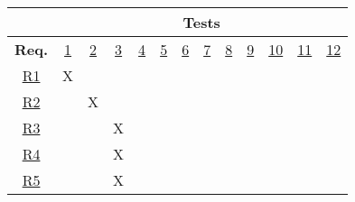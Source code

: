 \documentclass[12pt, titlepage]{article}
\begin{document}
\begin{table}[H]
    \centering
    
    \begin{tabular}{|c|cccccccccccc|}
\hline
 & \multicolumn{12}{c|}{\textbf{Tests}} \\
\hline
\textbf{Req.} & \multicolumn{1}{c|}{\hyperref[test-1]{1}} & \multicolumn{1}{c|}{\hyperref[test-2]{2}} & \multicolumn{1}{c|}{\hyperref[test-3]{3}}
& \multicolumn{1}{c|}{\hyperref[test-4]{4}} & \multicolumn{1}{c|}{\hyperref[test-5]{5}} & \multicolumn{1}{c|}{\hyperref[test-6]{6}}
& \multicolumn{1}{c|}{\hyperref[test-7]{7}} & \multicolumn{1}{c|}{\hyperref[test-8]{8}} & \multicolumn{1}{c|}{\hyperref[test-9]{9}}
& \multicolumn{1}{c|}{\hyperref[test-10]{10}} & \multicolumn{1}{c|}{\hyperref[test-11]{11}} & \hyperref[test-12]{12} \\ \hline

\hyperref[R1]{R1} & \multicolumn{1}{c|}{X}  & \multicolumn{1}{c|}{}  & \multicolumn{1}{c|}{}
& \multicolumn{1}{c|}{}  & \multicolumn{1}{c|}{}  & \multicolumn{1}{c|}{}
& \multicolumn{1}{c|}{}  & \multicolumn{1}{c|}{}  & \multicolumn{1}{c|}{}
& \multicolumn{1}{c|}{}   & \multicolumn{1}{c|}{}   &    \\ \hline

\hyperref[R2]{R2} & \multicolumn{1}{c|}{}  & \multicolumn{1}{c|}{X}  & \multicolumn{1}{c|}{}
& \multicolumn{1}{c|}{}  & \multicolumn{1}{c|}{}  & \multicolumn{1}{c|}{}
& \multicolumn{1}{c|}{}  & \multicolumn{1}{c|}{}  & \multicolumn{1}{c|}{}
& \multicolumn{1}{c|}{}   & \multicolumn{1}{c|}{}   &    \\ \hline

\hyperref[R3]{R3} & \multicolumn{1}{c|}{}  & \multicolumn{1}{c|}{}  & \multicolumn{1}{c|}{X}
& \multicolumn{1}{c|}{}  & \multicolumn{1}{c|}{}  & \multicolumn{1}{c|}{}
& \multicolumn{1}{c|}{}  & \multicolumn{1}{c|}{}  & \multicolumn{1}{c|}{}
& \multicolumn{1}{c|}{}   & \multicolumn{1}{c|}{}   &    \\ \hline

\hyperref[R4]{R4} & \multicolumn{1}{c|}{}  & \multicolumn{1}{c|}{}  & \multicolumn{1}{c|}{X}
& \multicolumn{1}{c|}{}  & \multicolumn{1}{c|}{}  & \multicolumn{1}{c|}{}
& \multicolumn{1}{c|}{}  & \multicolumn{1}{c|}{}  & \multicolumn{1}{c|}{}
& \multicolumn{1}{c|}{}   & \multicolumn{1}{c|}{}   &    \\ \hline

\hyperref[R5]{R5} & \multicolumn{1}{c|}{}  & \multicolumn{1}{c|}{}  & \multicolumn{1}{c|}{X}
& \multicolumn{1}{c|}{}  & \multicolumn{1}{c|}{}  & \multicolumn{1}{c|}{}
& \multicolumn{1}{c|}{}  & \multicolumn{1}{c|}{}  & \multicolumn{1}{c|}{}
& \multicolumn{1}{c|}{}   & \multicolumn{1}{c|}{}   &    \\ \hline


\end{tabular}
\end{table}
\end{document}
